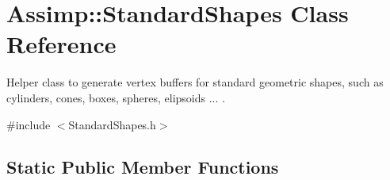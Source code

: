 \hypertarget{class_assimp_1_1_standard_shapes}{\section{Assimp\+:\+:Standard\+Shapes Class Reference}
\label{class_assimp_1_1_standard_shapes}
}


Helper class to generate vertex buffers for standard geometric shapes, such as cylinders, cones, boxes, spheres, elipsoids ... .  




{\ttfamily \#include $<$Standard\+Shapes.\+h$>$}

\subsection*{Static Public Member Functions}
